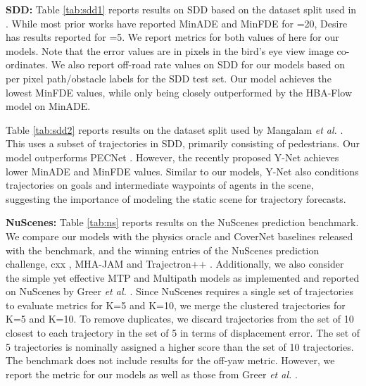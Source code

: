 \documentclass[journal]{IEEEtran}
\begin{document}
\vspace{0.1in}

\noindent \textbf{SDD:} Table \ref{tab:sdd1} reports results on SDD based on the dataset split used in \cite{sadeghian2018sophie}. While most prior works have reported MinADE and MinFDE for =20, Desire \cite{lee2017desire} has results reported for =5. We report metrics for both values of  here for our models. Note that the error values are in pixels in the bird's eye view image co-ordinates. We also report off-road rate values on SDD for our models based on per pixel path/obstacle labels for the SDD test set. Our model achieves the lowest MinFDE values, while only being closely outperformed by the HBA-Flow model on MinADE. 

Table \ref{tab:sdd2} reports results on the dataset split used by Mangalam \textit{et al.} \cite{mangalam2020not, mangalam2020goals}. This uses a subset of trajectories in SDD, primarily consisting of pedestrians. Our model outperforms PECNet \cite{mangalam2020not}. However, the recently proposed Y-Net \cite{mangalam2020goals} achieves lower MinADE and MinFDE values. Similar to our models, Y-Net also conditions trajectories on goals and intermediate waypoints of agents in the scene, suggesting the importance of modeling the static scene for trajectory forecasts.  

\vspace{0.1in}
\noindent \textbf{NuScenes:} Table \ref{tab:ns} reports results on the NuScenes prediction benchmark. We compare our models with the physics oracle and CoverNet\cite{phan2020covernet} baselines released with the benchmark, and the winning entries of the NuScenes prediction challenge, cxx \cite{luo2020probabilistic}, MHA-JAM \cite{messaoud2020multi} and Trajectron++ \cite{salzmann2020trajectron++}. Additionally, we also consider the simple yet effective MTP \cite{cui2019multimodal} and Multipath \cite{chai2020multipath} models as implemented and reported on NuScenes by Greer \textit{et al.} \cite{greer2020trajectory}. Since NuScenes requires a single set of trajectories to evaluate metrics for K=5 and K=10, we merge the clustered trajectories for K=5 and K=10. To remove duplicates, we discard trajectories from the set of 10 closest to each trajectory in the set of 5 in terms of displacement error. The set of 5 trajectories is nominally assigned a higher score than the set of 10 trajectories. The benchmark does not include results for the off-yaw metric. However, we report the metric for our models as well as those from Greer \textit{et al.} \cite{greer2020trajectory}. 
\end{document}

